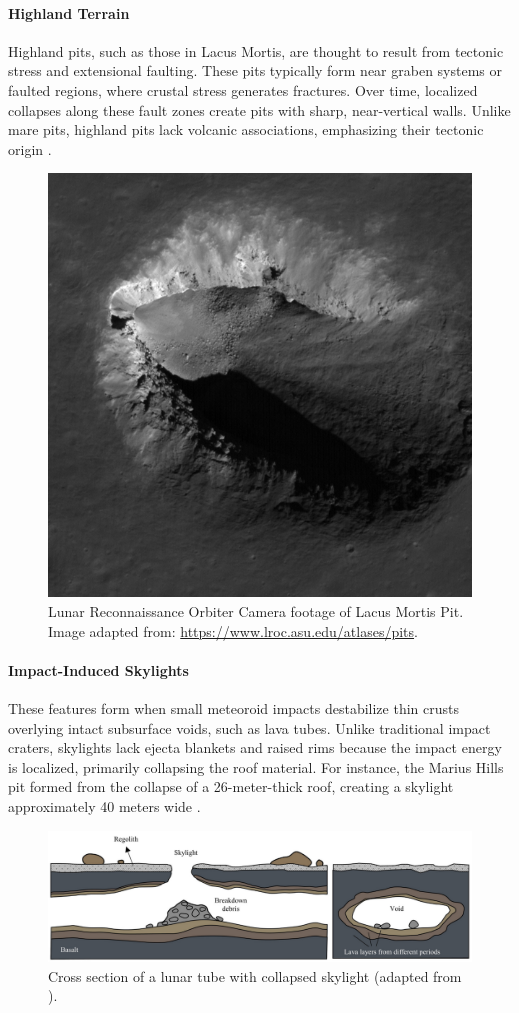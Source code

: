 \paragraph{Highland Terrain} 
Highland pits, such as those in Lacus Mortis, are thought to result from tectonic stress and extensional faulting. These pits typically form near graben systems or faulted regions, where crustal stress generates fractures. Over time, localized collapses along these fault zones create pits with sharp, near-vertical walls. Unlike mare pits, highland pits lack volcanic associations, emphasizing their tectonic origin \cite{new-wagner, lunar-pit-distribution}.

\begin{figure}[H]
    \centering
    \includegraphics[width=0.33\linewidth]{lunar-pit-highland.png}
    \caption{Lunar Reconnaissance Orbiter Camera footage of Lacus Mortis Pit. Image adapted from: \url{https://www.lroc.asu.edu/atlases/pits}.}
    \label{fig:highland-lunar-pit}
\end{figure}

\paragraph{Impact-Induced Skylights}
These features form when small meteoroid impacts destabilize thin crusts overlying intact subsurface voids, such as lava tubes. Unlike traditional impact craters, skylights lack ejecta blankets and raised rims because the impact energy is localized, primarily collapsing the roof material. For instance, the Marius Hills pit formed from the collapse of a 26-meter-thick roof, creating a skylight approximately 40 meters wide \cite{clrn-impact-melt, lunar-pits-numerical-modelling}.

\begin{figure}[H]
    \centering
    \includegraphics[width=0.99\linewidth]{lunar-pit-in-lava-tube.png}
    \caption{Cross section of a lunar tube with collapsed skylight (adapted from \cite{bases-feng}).}
    \label{fig:impact-induced-skylight}
\end{figure}
